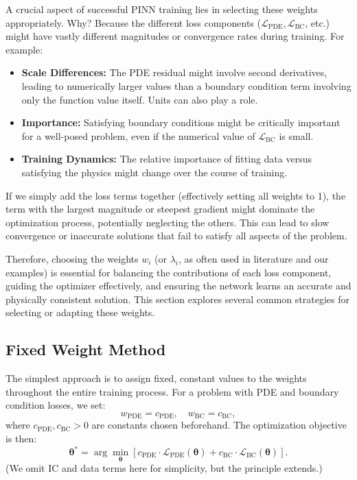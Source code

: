 A crucial aspect of successful PINN training lies in selecting these weights appropriately. Why? Because the different loss components ($\mathcal{L}_{\text{PDE}}, \mathcal{L}_{\text{BC}}$, etc.) might have vastly different magnitudes or convergence rates during training. For example:
\begin{itemize}
    \item \textbf{Scale Differences:} The PDE residual might involve second derivatives, leading to numerically larger values than a boundary condition term involving only the function value itself. Units can also play a role.
    \item \textbf{Importance:} Satisfying boundary conditions might be critically important for a well-posed problem, even if the numerical value of $\mathcal{L}_{\text{BC}}$ is small.
    \item \textbf{Training Dynamics:} The relative importance of fitting data versus satisfying the physics might change over the course of training.
\end{itemize}
If we simply add the loss terms together (effectively setting all weights to 1), the term with the largest magnitude or steepest gradient might dominate the optimization process, potentially neglecting the others. This can lead to slow convergence or inaccurate solutions that fail to satisfy all aspects of the problem.

Therefore, choosing the weights $w_i$ (or $\lambda_i$, as often used in literature and our examples) is essential for balancing the contributions of each loss component, guiding the optimizer effectively, and ensuring the network learns an accurate and physically consistent solution. This section explores several common strategies for selecting or adapting these weights.

\subsection{Fixed Weight Method}
\label{subsec:fixed_weights}

The simplest approach is to assign fixed, constant values to the weights throughout the entire training process. For a problem with PDE and boundary condition losses, we set:
%
\begin{equation*}
w_{\text{PDE}} = c_{\text{PDE}}, \quad w_{\text{BC}} = c_{\text{BC}}, 
\end{equation*} 
%
where $c_{\text{PDE}}, c_{\text{BC}} > 0$ are constants chosen beforehand. The optimization objective is then:
%
\begin{equation*} 
\boldsymbol{\theta}^* = \arg\min_{\boldsymbol{\theta}} \left[ c_{\text{PDE}} \cdot \mathcal{L}_{\text{PDE}}(\boldsymbol{\theta}) + c_{\text{BC}} \cdot \mathcal{L}_{\text{BC}}(\boldsymbol{\theta}) \right]. 
\end{equation*}
%
(We omit IC and data terms here for simplicity, but the principle extends.)

